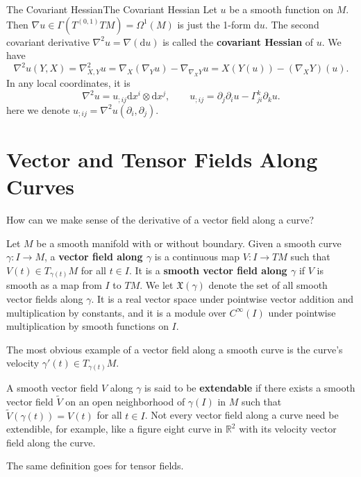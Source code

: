 \documentclass[../main.tex]{subfiles}
\begin{document}
\begin{example}{The Covariant Hessian}{The Covariant Hessian}
	Let $u$ be a smooth function on $M$. Then $\nabla u \in \Gamma(T^{(0, 1)} TM) = \Omega^1(M)$ is just the 1-form $\mathrm{d} u$. The second covariant derivative $\nabla^2 u = \nabla(\mathrm{d} u)$ is called the \textbf{covariant Hessian} of $u$. We have
	\begin{equation}
		\nabla^2 u(Y, X) = \nabla_{X,Y}^2 u = \nabla_X(\nabla_Y u) - \nabla_{\nabla_X Y} u = X(Y(u)) - (\nabla_X Y)(u).
	\end{equation}
	In any local coordinates, it is
	\begin{equation}
		\nabla^2 u = u_{;ij} \mathrm{d} x^i \otimes \mathrm{d} x^j, \qquad u_{;ij} = \partial_j \partial_i u - \Gamma_{ji}^k \partial_k u.
	\end{equation}
	here we denote $u_{;ij} = \nabla^2 u(\partial_i, \partial_j)$.
\end{example}

\section{Vector and Tensor Fields Along Curves}
How can we make sense of the derivative of a vector field along a curve? 

Let $M$ be a smooth manifold with or without boundary. Given a smooth curve $\gamma: I \to M$, a \textbf{vector field along $\gamma$} is a continuous map $V: I \to TM$ such that $V(t) \in T_{\gamma(t)} M$ for all $t \in I$. It is a \textbf{smooth vector field along $\gamma$} if $V$ is smooth as a map from $I$ to $TM$. We let $\mathfrak{X}(\gamma)$ denote the set of all smooth vector fields along $\gamma$. It is a real vector space under pointwise vector addition and multiplication by constants, and it is a module over $C^{\infty}(I)$ under pointwise multiplication by smooth functions on $I$.

The most obvious example of a vector field along a smooth curve  is the curve’s velocity $\gamma'(t) \in T_{\gamma(t)} M$.

A smooth vector field $V$ along $\gamma$ is said to be \textbf{extendable} if there exists a smooth vector field $\tilde{V}$ on an open neighborhood of $\gamma(I)$ in $M$ such that $\tilde{V}(\gamma(t)) = V(t)$ for all $t \in I$. Not every vector field along a curve need be extendible, for example, like a figure eight curve in $\mathbb{R}^2$ with its velocity vector field along the curve.

The same definition goes for tensor fields.
\end{document}
